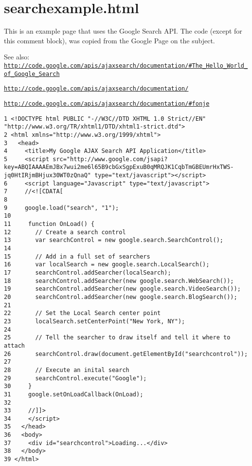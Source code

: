 \hypertarget{searchexample_8html-example}{
\section{searchexample.html}
}
This is an example page that uses the Google Search API. The code (except for this comment block), was copied from the Google Page on the subject. \begin{Desc}
\item[See also:]\href{http://code.google.com/apis/ajaxsearch/documentation/#The_Hello_World_of_Google_Search}{\tt http://code.google.com/apis/ajaxsearch/documentation/\#The\_\-Hello\_\-World\_\-of\_\-Google\_\-Search} 

\href{http://code.google.com/apis/ajaxsearch/documentation/}{\tt http://code.google.com/apis/ajaxsearch/documentation/} 

\href{http://code.google.com/apis/ajaxsearch/documentation/#fonje}{\tt http://code.google.com/apis/ajaxsearch/documentation/\#fonje}\end{Desc}


\begin{DocInclude}\begin{verbatim}1 <!DOCTYPE html PUBLIC "-//W3C//DTD XHTML 1.0 Strict//EN" "http://www.w3.org/TR/xhtml1/DTD/xhtml1-strict.dtd">
2 <html xmlns="http://www.w3.org/1999/xhtml">
3   <head>
4     <title>My Google AJAX Search API Application</title>
5     <script src="http://www.google.com/jsapi?key=ABQIAAAAEmJBx7wui2me6l65B9cbGxSgpExuB0qMRQJK1CqbTmGBEUmrHxTWS-jq0HtIRjmBHjux30WT0zQnaQ" type="text/javascript"></script>
6     <script language="Javascript" type="text/javascript">
7     //<![CDATA[
8 
9     google.load("search", "1");
10 
11     function OnLoad() {
12       // Create a search control
13       var searchControl = new google.search.SearchControl();
14 
15       // Add in a full set of searchers
16       var localSearch = new google.search.LocalSearch();
17       searchControl.addSearcher(localSearch);
18       searchControl.addSearcher(new google.search.WebSearch());
19       searchControl.addSearcher(new google.search.VideoSearch());
20       searchControl.addSearcher(new google.search.BlogSearch());
21 
22       // Set the Local Search center point
23       localSearch.setCenterPoint("New York, NY");
24 
25       // Tell the searcher to draw itself and tell it where to attach
26       searchControl.draw(document.getElementById("searchcontrol"));
27 
28       // Execute an inital search
29       searchControl.execute("Google");
30     }
31     google.setOnLoadCallback(OnLoad);
32 
33     //]]>
34     </script>
35   </head>
36   <body>
37     <div id="searchcontrol">Loading...</div>
38   </body>
39 </html>
\end{verbatim}
\end{DocInclude}
 
